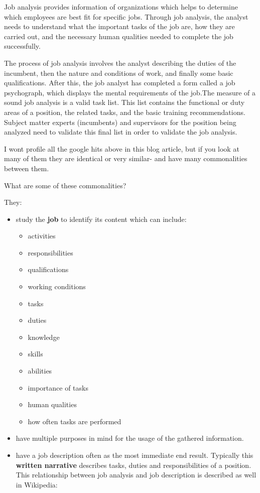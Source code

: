 \documentclass[12pt,letterpaper]{article}
\begin{document}
Job analysis provides information of organizations which helps to
determine which employees are best fit for specific jobs. Through job
analysis, the analyst needs to understand what the important tasks of
the job are, how they are carried out, and the necessary human qualities
needed to complete the job successfully.

The process of job analysis involves the analyst describing the duties
of the incumbent, then the nature and conditions of work, and finally
some basic qualifications. After this, the job analyst has completed a
form called a job psychograph, which displays the mental requirements of
the job.The measure of a sound job analysis is a valid task
list. This list contains the functional or duty areas of a position, the
related tasks, and the basic training recommendations. Subject matter
experts (incumbents) and supervisors for the position being analyzed
need to validate this final list in order to validate the job
analysis.

I wont profile all the google hits above in this blog article, but if
you look at many of them they are identical or very similar- and have
many commonalities between them.

What are some of these commonalities?

They:

\begin{itemize}
\item
  study the \textbf{job} to identify its content which can include:

  \begin{itemize}

  \item
    activities
  \item
    responsibilities
  \item
    qualifications
  \item
    working conditions
  \item
    tasks
  \item
    duties
  \item
    knowledge
  \item
    skills
  \item
    abilities
  \item
    importance of tasks
  \item
    human qualities
  \item
    how often tasks are performed
  \end{itemize}
\item
  have multiple purposes in mind for the usage of the gathered
  information.
\item
  have a job description often as the most immediate end result.
  Typically this \textbf{written narrative} describes tasks, duties and
  responsibilities of a position. This relationship between job analysis
  and job description is described as well in Wikipedia:
\end{itemize}
\end{document}
